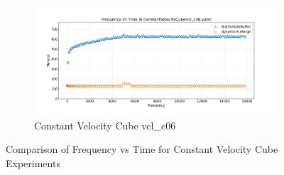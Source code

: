 \begin{figure}[htbp]
    \begin{subfigure}[b]{\textwidth}
        \centering
        \includegraphics[width=0.9\linewidth]{graphs/constantVelocityCube/normalExperiments/freq/vclc06.png}
        \vspace{-0.5em}
        \caption{\scriptsize Constant Velocity Cube vcl\_c06}
        \label{fig:vclc06constantVelocityCube}
    \end{subfigure}

    \vspace{1em}
    \caption{Comparison of Frequency vs Time for Constant Velocity Cube Experiments}
    \label{fig:mainConstantVelocityCube}
\end{figure}




